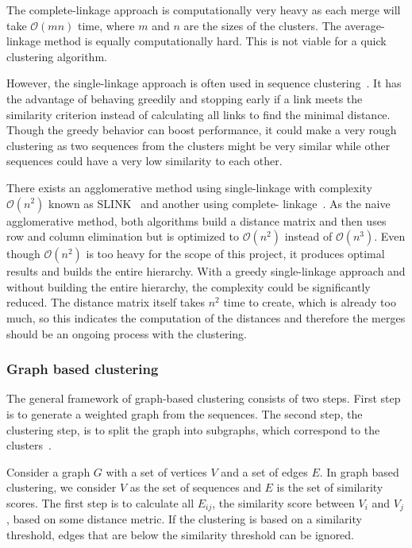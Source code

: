 The complete-linkage approach is computationally very heavy as each merge will
take $\mathcal{O}(mn)$ time, where $m$ and $n$ are the sizes of the clusters.
The average-linkage method is equally computationally hard. This is not viable
for a quick clustering algorithm.

However, the single-linkage approach is often used in sequence
clustering~\cite[pp. 62-63]{dong}. It has the advantage of behaving greedily
and stopping early if a link meets the similarity criterion instead of
calculating all links to find the minimal distance. Though the greedy behavior
can boost performance, it could make a very rough clustering as two sequences
from the clusters might be very similar while other sequences could have a very
low similarity to each other.

There exists an agglomerative method using single-linkage with complexity
$\mathcal{O}(n^2)$ known as SLINK~\cite{sibson} and another using complete-
linkage~\cite{defays}. As the naive agglomerative method, both algorithms build
a distance matrix and then uses row and column elimination but is optimized to
$\mathcal{O}(n^2)$ instead of $\mathcal{O}(n^3)$. Even though $\mathcal{O}(n^2)$
is too heavy for the scope of this project, it produces optimal results and
builds the entire hierarchy. With a greedy single-linkage approach and without
building the entire hierarchy, the complexity could be significantly reduced.
The distance matrix itself takes $n^2$ time to create, which is already too
much, so this indicates the computation of the distances and therefore the
merges should be an ongoing process with the clustering.

\subsubsection{Graph based clustering}

The general framework of graph-based clustering consists of two steps. First
step is to generate a weighted graph from the sequences. The second step, the
clustering step, is to split the graph into subgraphs, which correspond to the
clusters~\cite[pp. 64-65]{dong}.

Consider a graph $G$ with a set of vertices $V$ and a set of edges $E$. In
graph based clustering, we consider $V$ as the set of sequences and $E$ is the
set of similarity scores. The first step is to calculate all $E_{ij}$, the
similarity score between $V_i$ and $V_j$, based on some distance metric. If the
clustering is based on a similarity threshold, edges that are below the
similarity threshold can be ignored.

